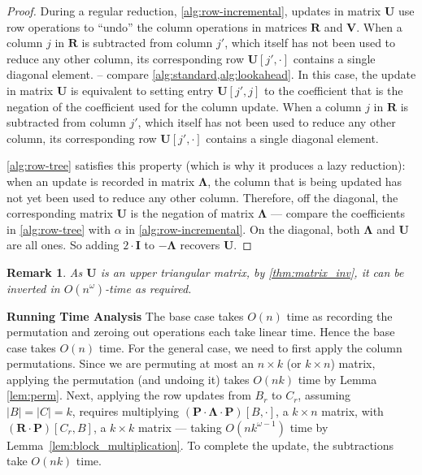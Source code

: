 \documentclass[10pt,a4paper]{article}
\newtheorem{remark}[theorem]{Remark}
\newcommand{\matsize}[2]{#1\times #2}
\newcommand{\matexp}{\omega}
\newcommand{\mat}[1]{\mathbf{#1}}
\begin{document}
\begin{proof}
    During a regular reduction, \cref{alg:row-incremental}, updates in matrix $\mat{U}$ use row operations to ``undo'' the column operations in matrices $\mat{R}$ and $\mat{V}$. When a column $j$ in $\mat{R}$ is subtracted from column $j'$, which itself has not been used to reduce any other column, its corresponding row $\mat{U}[j',\cdot]$ contains a single diagonal element.
     -- compare \cref{alg:standard,alg:lookahead}.
    In this case, the update in matrix $\mat{U}$ is equivalent to setting entry $\mat{U}[j',j]$ to the coefficient that is the negation of the coefficient used for the column update.
%
%
 When a column $j$ in $\mat{R}$ is subtracted from column $j'$, which itself has not been used to reduce any other column, its corresponding row $\mat{U}[j',\cdot]$ contains a single diagonal element.

    \cref{alg:row-tree} satisfies this property (which is why it produces a lazy reduction): when an update is recorded in matrix $\mat{\Lambda}$, the column that is being updated has not yet been used to reduce any other column. Therefore, off the diagonal,  the corresponding matrix $\mat{U}$ is the negation of matrix $\mat{\Lambda}$ --- compare the coefficients in  \cref{alg:row-tree} with $\alpha$ in  \cref{alg:row-incremental}. On the diagonal, both $\mat{\Lambda}$ and $\mat{U}$ are all ones.
    So adding $2 \cdot \mat{I}$ to $-\mat{\Lambda}$ recovers $\mat{U}$.
\end{proof}
\begin{remark}
As $\mat{U}$ is an upper triangular matrix, by \cref{thm:matrix_inv}, it can be inverted in $O(n^{\matexp})$-time as required. 
\end{remark}
\noindent\textbf{Running Time Analysis}
The base case takes $O(n)$ time as recording the permutation and zeroing out operations each take linear time. Hence the base case takes $O(n)$ time. 
%
For the general case, we need to first apply the column permutations. Since we are permuting at most an $\matsize{n}{k}$ (or $\matsize{k}{n}$) matrix, applying the permutation (and undoing it) takes $O(nk)$ time by Lemma \ref{lem:perm}. 
Next, applying the row updates from $B_r$ to $C_r$, assuming $|B|=|C| = k$, requires multiplying $(\mat{P} \cdot \mat{\Lambda} \cdot \mat{P})[B,\cdot]$, a $\matsize{k}{n}$ matrix, with $(\mat{R}\cdot\mat{P})[C_r,B]$, a $\matsize{k}{k}$ matrix --- taking
$O(nk^{\matexp-1})$ time by Lemma~\ref{lem:block_multiplication}. To complete the update, the subtractions take $O(nk)$ time. %
\end{document}
